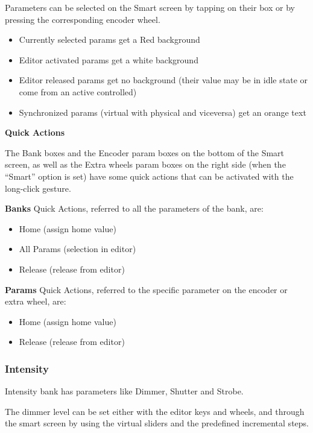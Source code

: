 \documentclass[
]{article}
\begin{document}
Parameters can be selected on the Smart screen by tapping on their box or by pressing the corresponding encoder wheel.

\begin{itemize}
\item
  Currently selected params get a Red background
\item
  Editor activated params get a white background
\item
  Editor released params get no background (their value may be in idle state or come from an active controlled)
\item
  Synchronized params (virtual with physical and viceversa) get an orange text
\end{itemize}

\textbf{Quick Actions}

The Bank boxes and the Encoder param boxes on the bottom of the Smart screen, as well as the Extra wheels param boxes on the right side (when the ``Smart'' option is set) have some quick actions that can be activated with the long-click gesture.

\textbf{Banks} Quick Actions, referred to all the parameters of the bank, are:

\begin{itemize}
\item
  Home (assign home value)
\item
  All Params (selection in editor)
\item
  Release (release from editor)
\end{itemize}

\textbf{Params} Quick Actions, referred to the specific parameter on the encoder or extra wheel, are:

\begin{itemize}
\item
  Home (assign home value)
\item
  Release (release from editor)
\end{itemize}

\hypertarget{intensity}{%
\subsubsection{Intensity}\label{intensity}}

Intensity bank has parameters like Dimmer, Shutter and Strobe.

The dimmer level can be set either with the editor keys and wheels, and through the smart screen by using the virtual sliders and the predefined incremental steps.
\end{document}
